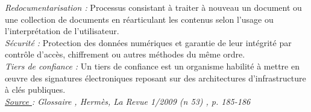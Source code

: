 \documentclass[a4paper,12pt]{article}
\begin{document}
\emph{Redocumentarisation :} Processus consistant à traiter à nouveau un document ou une collection de documents en réarticulant les contenus selon l’usage ou l’interprétation de l’utilisateur. \\


\emph{Sécurité :} Protection des données numériques et garantie de leur intégrité par contrôle d’accès, chiffrement ou autres méthodes du même ordre. \\


\emph{Tiers de confiance :} Un tiers de confiance est un organisme habilité à mettre en œuvre des signatures électroniques reposant sur des architectures d’infrastructure à clés publiques. \\



\emph{\underline{Source }: \emph{Glossaire }, Hermès, La Revue 1/2009 (n 53) , p. 185-186 }

\newpage
\nocite{*}

\end{document}
